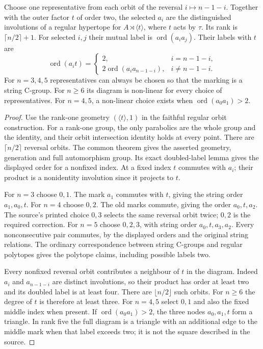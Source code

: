 \begin{proposition}\label{prop:fold}
Choose one representative from each orbit of the reversal
$i\mapsto n-1-i$. Together with the outer factor $t$ of order two,
the selected $a_i$ are the distinguished involutions of a regular
hypertope for $A\rtimes\langle t\rangle$, where $t$ acts by $\tau$.
Its rank is $\lceil n/2\rceil+1$. For selected $i,j$ their mutual
label is $\operatorname{ord}(a_ia_j)$. Their labels with $t$ are
\[
 \operatorname{ord}(a_it)=
 \begin{cases}
 2,&i=n-1-i,\\
 2\operatorname{ord}(a_i a_{n-1-i}),&i\ne n-1-i.
 \end{cases}
\]
For $n=3,4,5$ representatives can always be chosen so that the marking
is a string C-group. For $n\geq6$ its diagram is non-linear for every
choice of representatives. For $n=4,5$, a non-linear choice exists when
$\operatorname{ord}(a_0a_1)>2$.
\end{proposition}
\begin{proof}
Use the rank-one geometry $(\langle t\rangle,1)$ in the faithful
regular orbit construction. For a rank-one group, the only parabolics
are the whole group and the identity, and their orbit intersection
identity holds at every point. There are $\lceil n/2\rceil$ reversal
orbits. The common theorem gives the asserted geometry, generation and
full automorphism group. Its exact doubled-label lemma gives the displayed
order for a nonfixed index. At a fixed index $t$ commutes with $a_i$;
their product is a nonidentity involution since it projects to $t$.

For $n=3$ choose $0,1$. The mark $a_1$ commutes with $t$, giving
the string order $a_1,a_0,t$. For $n=4$ choose $0,2$. The old marks
commute, giving the order $a_0,t,a_2$. The source's printed choice
$0,3$ selects the same reversal orbit twice; $0,2$ is the required
correction. For $n=5$ choose $0,2,3$, with string order
$a_0,t,a_3,a_2$. Every nonconsecutive pair commutes, by the displayed
orders and the original string relations. The ordinary correspondence
between string C-groups and regular polytopes gives the polytope claims,
including possible labels two.

Every nonfixed reversal orbit contributes a neighbour of $t$ in the
diagram. Indeed $a_i$ and $a_{n-1-i}$ are distinct involutions, so their
product has order at least two and its doubled label is at least four.
There are $\lfloor n/2\rfloor$ such orbits. For $n\geq6$ the degree
of $t$ is therefore at least three. For $n=4,5$ select $0,1$ and also
the fixed middle index when present. If $\operatorname{ord}(a_0a_1)>2$,
the three nodes $a_0,a_1,t$ form a triangle. In rank five the full
diagram is a triangle with an additional edge to the middle mark when
that label exceeds two; it is not the square described in the source.
\end{proof}

